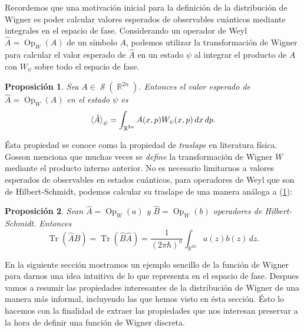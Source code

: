 \documentclass[a4paper,11pt]{report}
\DeclareMathOperator{\R}{\mathbb{R}}
\DeclareMathOperator{\Sz}{\mathcal S}
\DeclareMathOperator{\Tr}{Tr}
\DeclareMathOperator{\Op}{Op}
\newtheorem{proposition}{Proposición}
\begin{document}
  Recordemos que una motivación inicial para la definición
  de la distribución de Wigner es poder calcular valores
  esperados de observables cuánticos mediante integrales en
  el espacio de fase. Considerando un operador de Weyl $\hat
  A = \Op_W(A)$ de un símbolo $A$, podemos utilizar la
  transformación de Wigner para calcular el valor esperado
  de $\hat A$ en un estado $\psi$ al integrar el producto de
  $A$ con $W_\psi$ sobre todo el espacio de fase.
  \begin{proposition}
    \label{prop:wigner-weyl}
    Sea $A \in \Sz(\R^{2n})$. Entonces el valor esperado de
    $\hat A = \Op_W(A)$ en el estado $\psi$ es
    \begin{equation}
      \braket{\hat{A}}_\psi
      = \int_{\R^{2n}} A(x,p)W_\psi(x,p) \, dx \, dp.
    \end{equation}
  \end{proposition}
  Ésta propiedad se conoce como la propiedad de
  \textit{traslape} en literatura física.  Gosson menciona
  que muchas veces se \textit{define} la transformación de
  Wigner $W$ mediante el producto interno anterior. No es
  necesario limitarnos a valores esperados de observables en
  estados cuánticos, para operadores de Weyl que son de
  Hilbert-Schmidt, podemos calcular su traslape de una
  manera análoga a (\ref{prop:wigner-weyl}):
  \begin{proposition}
    Sean $\hat{A} = \Op_W(a)$ y $\hat{B} = \Op_W(b)$
    operadores de Hilbert-Schmidt. Entonces
    \begin{equation}
      \Tr\left( \hat{A}\hat{B} \right) 
      = \Tr\left( \hat{B}\hat{A} \right) 
      = \frac{1}{(2\pi\hbar)^{n}} \int_{\R^{2n}} a(z)b(z) \,
      dz.
    \end{equation}
  \end{proposition}
  En la siguiente sección mostramos un ejemplo sencillo de
  la función de Wigner para darnos una idea intuitiva de lo
  que representa en el espacio de fase. Despues vamos a
  resumir las propiedades interesantes de la distribución de
  Wigner de una manera más informal, incluyendo las que
  hemos visto en ésta sección. Ésto lo hacemos con la
  finalidad de extraer las propiedades que nos interesan
  preservar a la hora de definir una función de Wigner
  discreta.
\end{document}

